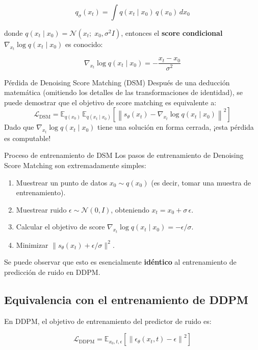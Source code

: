 \documentclass[a4paper]{article}
\begin{document}
$$q_\sigma(x_t) = \int q(x_t \mid x_0)\, q(x_0)\, dx_0$$

donde $q(x_t \mid x_0) = \mathcal{N}(x_t;\; x_0, \sigma^2 I)$, entonces el \textbf{score condicional} $\nabla_{x_t} \log q(x_t \mid x_0)$ es conocido:

$$\nabla_{x_t} \log q(x_t \mid x_0) = -\frac{x_t - x_0}{\sigma^2}$$

\begin{importantbox}{Pérdida de Denoising Score Matching (DSM)}
Después de una deducción matemática (omitiendo los detalles de las transformaciones de identidad), se puede demostrar que el objetivo de score matching es equivalente a:
$$\mathcal{L}_{\text{DSM}} = \mathbb{E}_{q(x_0)}\, \mathbb{E}_{q(x_t \mid x_0)}\left[\left\| s_\theta(x_t) - \nabla_{x_t} \log q(x_t \mid x_0) \right\|^2\right]$$
Dado que $\nabla_{x_t} \log q(x_t \mid x_0)$ tiene una solución en forma cerrada, ¡esta pérdida es computable!
\end{importantbox}

\begin{knowledgebox}{Proceso de entrenamiento de DSM}
Los pasos de entrenamiento de Denoising Score Matching son extremadamente simples:
\begin{enumerate}
    \item Muestrear un punto de datos $x_0 \sim q(x_0)$ (es decir, tomar una muestra de entrenamiento).
    \item Muestrear ruido $\epsilon \sim \mathcal{N}(0, I)$, obteniendo $x_t = x_0 + \sigma\, \epsilon$.
    \item Calcular el objetivo de score $\nabla_{x_t} \log q(x_t \mid x_0) = -\epsilon / \sigma$.
    \item Minimizar $\|s_\theta(x_t) + \epsilon/\sigma\|^2$.
\end{enumerate}
Se puede observar que esto es esencialmente \textbf{idéntico} al entrenamiento de predicción de ruido en DDPM.
\end{knowledgebox}

\subsection{Equivalencia con el entrenamiento de DDPM}

En DDPM, el objetivo de entrenamiento del predictor de ruido es:

$$\mathcal{L}_{\text{DDPM}} = \mathbb{E}_{x_0, t, \epsilon}\left[\left\| \epsilon_\theta(x_t, t) - \epsilon \right\|^2\right]$$
\end{document}
